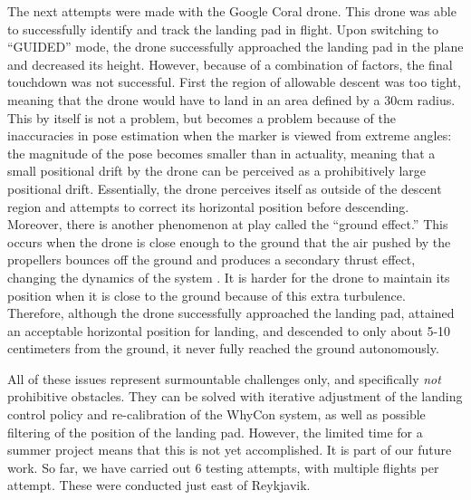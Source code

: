 The next attempts were made with the Google Coral drone. This drone was able to successfully identify and track the landing pad in flight. Upon switching to ``GUIDED'' mode, the drone successfully approached the landing pad in the plane and decreased its height. However, because of a combination of factors, the final touchdown was not successful. First the region of allowable descent was too tight, meaning that the drone would have to land in an area defined by a 30cm radius. This by itself is not a problem, but becomes a problem because of the inaccuracies in pose estimation when the marker is viewed from extreme angles: the magnitude of the pose becomes smaller than in actuality, meaning that a small positional drift by the drone can be perceived as a prohibitively large positional drift. Essentially, the drone perceives itself as outside of the descent region and attempts to correct its horizontal position before descending. Moreover, there is another phenomenon at play called the ``ground effect.'' This occurs when the drone is close enough to the ground that the air pushed by the propellers bounces off the ground and produces a secondary thrust effect, changing the dynamics of the system \cite{ground_effect_article}. It is harder for the drone to maintain its position when it is close to the ground because of this extra turbulence. Therefore, although the drone successfully approached the landing pad, attained an acceptable horizontal position for landing, and descended to only about 5-10 centimeters from the ground, it never fully reached the ground autonomously.

All of these issues represent surmountable challenges only, and specifically \textit{not} prohibitive obstacles. They can be solved with iterative adjustment of the landing control policy and re-calibration of the WhyCon system, as well as possible filtering of the position of the landing pad. However, the limited time for a summer project means that this is not yet accomplished. It is part of our future work. So far, we have carried out 6 testing attempts, with multiple flights per attempt. These were conducted just east of Reykjavik.